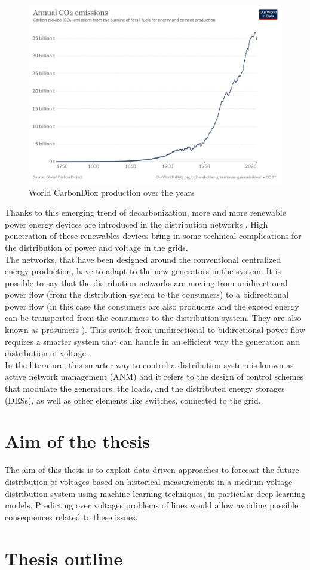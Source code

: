 \begin{figure}[H]
\centering
    \includegraphics[width=.6\linewidth]{images/Introduction/annual-co2-emissions-per-country.pdf}
\caption[\gls{CarbonDiox} production]{World \gls{CarbonDiox} production over the years \cite{C02prod}}
\end{figure}

Thanks to this emerging trend of decarbonization, more and more renewable power energy devices are introduced in the distribution networks \cite{owidenergy}. High penetration of these renewables devices bring in some technical complications for the distribution of power and voltage in the grids. \\
The networks, that have been designed around the conventional centralized energy production, have to adapt to the new generators in the system. It is possible to say that the distribution networks are moving from unidirectional power flow (from the distribution system to the consumers) to a bidirectional power flow (in this case the consumers are also producers and the exceed energy can be transported from the consumers to the distribution system. They are also known as prosumers \cite{prosumers}). This switch from unidirectional to bidirectional power flow requires a smarter system that can handle in an efficient way the generation and distribution of voltage.\\

In the literature, this smarter way to control a distribution system is known as active network management (\gls{ANM}) and it refers to the design of control schemes that modulate the generators, the loads, and the distributed energy storages (\glspl{DES}), as well as other elements like switches, connected to the grid. \\


\section{Aim of the thesis}
\label{sec:aimthesis}
The aim of this thesis is to exploit data-driven approaches to forecast the future distribution of voltages based on historical measurements in a medium-voltage distribution system using machine learning techniques, in particular deep learning models. Predicting over voltages problems of lines would allow avoiding possible consequences related to these issues. 


\section{Thesis outline}

